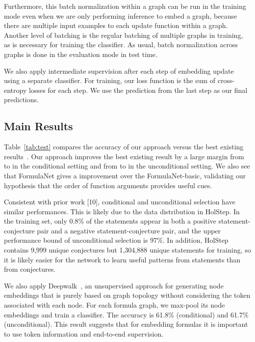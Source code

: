\documentclass{article}
\begin{document}
Furthermore, this batch
normalization within a graph can be run in the training mode even when we are
only performing inference to embed a graph, because there are multiple input examples to each update function within a
graph. Another level of batching is the regular batching of multiple graphs in training,
as is necessary for training the classifier. As usual, batch normalization across graphs is done in
 the evaluation mode in test time. 

We also apply intermediate supervision after each step of embedding update using a separate classifier. For training,
our loss function is the sum of cross-entropy losses for each step. We use the prediction
from the last step as our final predictions. 

\subsection{Main Results}

Table~\ref{tab:test} compares the accuracy of our approach versus  the best existing results~\cite{holstep}. Our approach improves the best existing result by a large margin from
 to  in the conditional setting and from  to  in the
unconditional setting. We also see that FormulaNet gives a  improvement over the FormulaNet-basic, validating our hypothesis that the order of function arguments provides useful cues. 

Consistent with prior work [10], conditional and unconditional selection have similar
performances. This is likely due to the data distribution in HolStep. In the
training set, only 0.8\% of the statements appear in both a positive statement-conjecture
pair and a negative statement-conjecture pair, and the upper performance bound of unconditional selection is 97\%. In addition, HolStep
contains 9,999 unique conjectures but 1,304,888 unique statements for training, so it is
likely easier for the network to learn useful patterns from statements than from
conjectures. 


We also apply Deepwalk~\cite{perozzi2014deepwalk}, an unsupervised approach for
  generating node embeddings that is purely based on graph topology without considering
  the token associated with each node. For each formula graph, we max-pool its node embeddings and train a
  classifier. The accuracy is 61.8\% (conditional) and 61.7\%
  (unconditional). This result suggests that for embedding formulas it is important to use token information
  and end-to-end supervision. 
\end{document}
